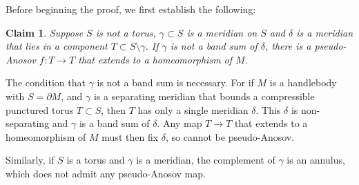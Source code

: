 \documentclass[12pt]{amsart}
\newtheorem{claim}[theorem]{Claim}
\theoremstyle{definition}
\theoremstyle{remark}
\begin{document}
Before beginning the proof, we first establish the following:
%

\begin {claim}\label{partialpaclaim}
Suppose $S$ is not a torus, $\gamma \subset S$  is a meridian on $S$ and $\delta$ is a meridian that lies in a component $T \subset S \setminus\gamma$. If $\gamma$ is not a band sum of $\delta $, there is a pseudo-Anosov $f: T\longrightarrow T$ that extends to a homeomorphism of $M $.
\end {claim}

The condition that $\gamma $ is not a band sum is necessary. For if $M$ is a handlebody with $S=\partial M$, and $\gamma$ is a separating meridian that bounds a compressible punctured torus $T \subset S$, then $T$  has only a single meridian $\delta$. This $\delta$ is non-separating and $\gamma$  is a band sum of $\delta$. Any map $T\longrightarrow T$ that extends to a homeomorphism of $M$
must then fix $\delta$,  so cannot be pseudo-Anosov.

Similarly, if $S $ is a torus and $\gamma$ is a meridian, the  complement of $\gamma$ is an annulus, which does not admit any pseudo-Anosov map.
\end{document}
